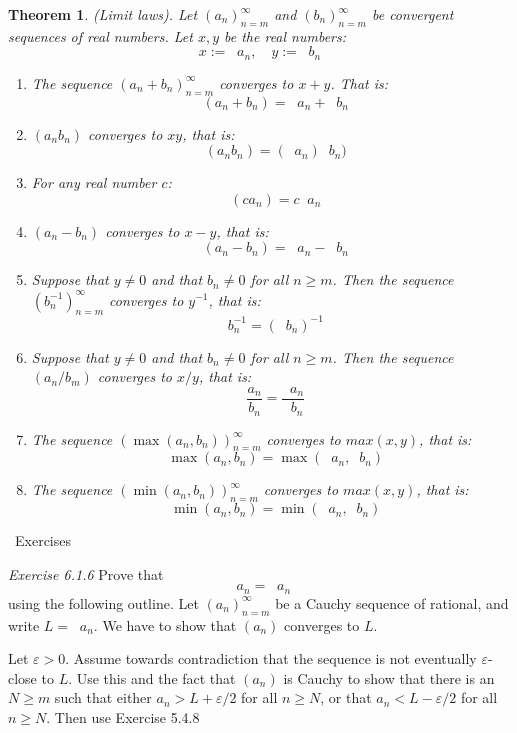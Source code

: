 \documentclass{article}
\newtheorem{theorem}{Theorem}[subsection]
\newcommand{\exercisesline}{	%
    \begin{center}
    \textemdash\ Exercises\ \textemdash
    \end{center}
}
\newcommand{\vep}{\varepsilon} %
\DeclareMathOperator{\infLIM}{\mathrm{LIM}_{n \to \infty}}
\DeclareMathOperator{\inflim}{\lim_{n \to \infty}}
\let\it\textit
\begin{document}
\begin{theorem}
	(Limit laws). Let $(a_n)_{n=m}^\infty$ 
	and $(b_n)_{n=m}^\infty$ be convergent
	sequences of real numbers. Let $x,y$ 
	be the real numbers:
	$$
	x := \inflim a_n,\quad y := \inflim b_n
	$$

	\begin{enumerate}[label=(\alph*)]
		\item The sequence $(a_n + b_n)_{n=m}^\infty$ 
			converges to $x + y$. That is:
			$$
			\inflim (a_n + b_n) = \inflim a_n + \inflim b_n
			$$
		\item $(a_nb_n)$ converges to $xy$, that is:
			$$
			\inflim (a_nb_n) = (\inflim a_n) \inflim b_n)
			$$
		\item For any real number $c$:
			$$
			\inflim (ca_n) = c \inflim a_n
			$$
		\item $(a_n - b_n)$ converges to $x-y$, that is:
			$$
			\inflim (a_n - b_n) = \inflim a_n - \inflim b_n
			$$
		\item Suppose that $y \neq 0$  and that $b_n \neq 0$ 
			for all $n \geq m$. Then 
			the sequence $(b_n^{-1})_{n=m}^\infty$
			converges to $y^{-1}$, that is:
			$$
			\inflim b_n^{-1} = \left( \inflim b_n \right)^{-1}
			$$
		\item Suppose that $y \neq 0$ and that 
			$b_n \neq 0$ for all $n \geq m$. 
			Then the sequence $(a_n/b_m)$ 
			converges to $x/y$, that is:
			$$
			\inflim \frac{a_n}{b_n} = \frac{
			\inflim a_n}{
			\inflim b_n}
			$$
		\item The sequence $(\max(a_n,b_n))^{\infty}_{n=m}$ 
			converges to $max(x,y)$, that is:
			$$
			\inflim \max(a_n, b_n) = \max\left(
				\inflim a_n, \inflim b_n
			\right)
			$$
		\item The sequence $(\min(a_n,b_n))^{\infty}_{n=m}$ 
			converges to $max(x,y)$, that is:
			$$
			\inflim \min(a_n, b_n) = \min\left(
				\inflim a_n, \inflim b_n
			\right)
			$$
	\end{enumerate}
\end{theorem}


\exercisesline

\it{Exercise 6.1.6} Prove that
$$
\infLIM a_n = \inflim a_n
$$
using the following outline. 
Let $(a_n)_{n=m}^\infty$ be a Cauchy 
sequence of rational, and write 
$L = \infLIM a_n$. We have to show 
that $(a_n)$ converges to $L$.

Let $\vep > 0$. Assume towards
contradiction that the sequence is not eventually 
$\vep$-close  to $L$. Use this 
and the fact that $(a_n)$ is Cauchy 
to show that there is an $N \geq m$ such 
that either $a_n > L + \vep / 2$ for all $n \geq N$,
or that $a_n < L - \vep / 2$ for all $n\geq N$. Then 
use Exercise 5.4.8
\end{document}
